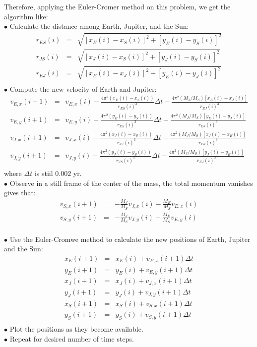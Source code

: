 \documentclass[11pt,twoside,a4paper]{article}
\begin{document}
Therefore, applying the Euler-Cromer method on this problem, we get the algorithm like:\\
$\bullet$ Calculate the distance among Earth, Jupiter, and the Sun:
\begin{eqnarray*}
	r_{ES}(i) &=& \sqrt{\left[x_E(i)-x_S(i)\right]^2+\left[y_E(i)-y_S(i)\right]^2}\\
	r_{JS}(i) &=& \sqrt{\left[x_J(i)-x_S(i)\right]^2+\left[y_J(i)-y_S(i)\right]^2}\\
	r_{EJ}(i) &=& \sqrt{\left[x_E(i)-x_J(i)\right]^2+\left[y_E(i)-y_J(i)\right]^2}\\
\end{eqnarray*}
$\bullet$ Compute the new velocity of Earth and Jupiter:
\begin{eqnarray*}
	v_{E,x}(i+1) &=& v_{E,x}(i)-\frac{4\pi^2\left(x_{E}(i)-x_{S}(i)\right)}{r_{ES}(i)^3}\Delta t-\frac{4\pi^2\left(M_J/M_S\right)\left[x_{E}(i)-x_{J}(i)\right]}{r_{EJ}(i)^3}\\
	v_{E,y}(i+1) &=& v_{E,y}(i)-\frac{4\pi^2\left(y_{E}(i)-y_{S}(i)\right)}{r_{ES}(i)^3}\Delta t-\frac{4\pi^2\left(M_J/M_S\right)\left[y_{E}(i)-y_{J}(i)\right]}{r_{EJ}(i)^3}\\
	v_{J,x}(i+1) &=& v_{J,x}(i)-\frac{4\pi^2\left(x_{J}(i)-x_{S}(i)\right)}{r_{JS}(i)^3}\Delta t-\frac{4\pi^2\left(M_J/M_S\right)\left[x_{J}(i)-x_{E}(i)\right]}{r_{EJ}(i)^3}\\
	v_{J,y}(i+1) &=& v_{J,y}(i)-\frac{4\pi^2\left(y_{J}(i)-y_{S}(i)\right)}{r_{JS}(i)^3}\Delta t-\frac{4\pi^2\left(M_J/M_S\right)\left[y_{J}(i)-y_{E}(i)\right]}{r_{EJ}(i)^3}\\
\end{eqnarray*}
where $\Delta t$ is stiil $0.002$ yr.\\
$\bullet$ Observe in a still frame of the center of the mass, the total momentum vanishes gives that:
\begin{eqnarray*}
v_{S,x}(i+1) &=& -\frac{M_J}{M_S}v_{J,x}(i) -\frac{M_E}{M_S}v_{E,x}(i)\\
v_{S,y}(i+1) &=& -\frac{M_J}{M_S}v_{J,y}(i) -\frac{M_E}{M_S}v_{E,y}(i)\\
\end{eqnarray*}

$\bullet$ Use the Euler-Cromwe method to calculate the new positions of Earth, Jupiter and the Sun:
\begin{eqnarray*}
	x_{E}(i+1) &=& x_{E}(i)+v_{E,x}(i+1)\Delta t\\
	y_{E}(i+1) &=& y_{E}(i)+v_{E,y}(i+1)\Delta t\\
	x_{J}(i+1) &=& x_{J}(i)+v_{J,x}(i+1)\Delta t\\
	y_{J}(i+1) &=& y_{J}(i)+v_{J,y}(i+1)\Delta t\\
	x_{S}(i+1) &=& x_{S}(i)+v_{S,x}(i+1)\Delta t\\
	y_{S}(i+1) &=& y_{S}(i)+v_{S,y}(i+1)\Delta t\\
\end{eqnarray*}
$\bullet$ Plot the positions as they become available.\\
$\bullet$ Repeat for desired number of time steps.\\\\\\
\end{document}
